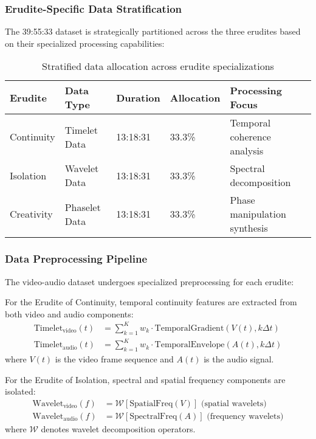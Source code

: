 \subsubsection{Erudite-Specific Data Stratification}

The 39:55:33 dataset is strategically partitioned across the three erudites based on their specialized processing capabilities:

\begin{table}[h]
\centering
\begin{tabular}{|l|l|l|l|l|}
\hline
\textbf{Erudite} & \textbf{Data Type} & \textbf{Duration} & \textbf{Allocation} & \textbf{Processing Focus} \\
\hline
Continuity & Timelet Data & 13:18:31 & 33.3\% & Temporal coherence analysis \\
\hline
Isolation & Wavelet Data & 13:18:31 & 33.3\% & Spectral decomposition \\
\hline
Creativity & Phaselet Data & 13:18:31 & 33.3\% & Phase manipulation synthesis \\
\hline
\end{tabular}
\caption{Stratified data allocation across erudite specializations}
\end{table}

\subsubsection{Data Preprocessing Pipeline}

The video-audio dataset undergoes specialized preprocessing for each erudite:

\begin{definition}
For the Erudite of Continuity, temporal continuity features are extracted from both video and audio components:
\begin{align}
\text{Timelet}_{\text{video}}(t) &= \sum_{k=1}^{K} w_k \cdot \text{TemporalGradient}(V(t), k\Delta t) \\
\text{Timelet}_{\text{audio}}(t) &= \sum_{k=1}^{K} w_k \cdot \text{TemporalEnvelope}(A(t), k\Delta t)
\end{align}
where $V(t)$ is the video frame sequence and $A(t)$ is the audio signal.
\end{definition}

\begin{definition}
For the Erudite of Isolation, spectral and spatial frequency components are isolated:
\begin{align}
\text{Wavelet}_{\text{video}}(f) &= \mathcal{W}[\text{SpatialFreq}(V)] \text{ (spatial wavelets)} \\
\text{Wavelet}_{\text{audio}}(f) &= \mathcal{W}[\text{SpectralFreq}(A)] \text{ (frequency wavelets)}
\end{align}
where $\mathcal{W}$ denotes wavelet decomposition operators.
\end{definition}

